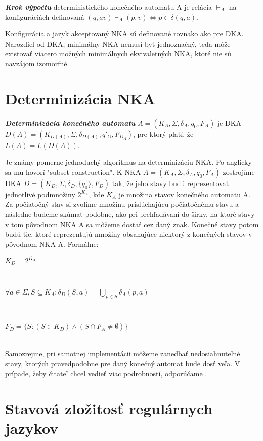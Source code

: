 \begin{defn}{\textbf {\textit {Krok výpočtu}}} deterministického konečného automatu A je relácia $\vdash_A$ na konfiguráciách definovaná $(q,av)\vdash_A(p,v) \Longleftrightarrow p \in \delta(q,a)$.\end{defn}

Konfigurácia a jazyk akceptovaný NKA sú definované rovnako ako pre DKA. Narozdiel od DKA, minimálny NKA nemusí byť jednoznačný, teda môže existovať viacero možných minimálnych ekvivaletných NKA, ktoré nie sú navzájom izomorfné.


\section{Determinizácia NKA}

\begin{defn}{\textbf {\textit {Determinizácia konečného automatu}}} $A = (K_A,\Sigma,\delta_A,q_{0},F_A)$ je DKA $D(A) = (K_{D(A)},\Sigma,\delta_{D(A)},q'_{O},F_{D_A})$, pre ktorý platí, že $L(A) = L(D(A))$.
\end{defn}

Je známy pomerne jednoduchý algoritmus na determinizáciu NKA. Po anglicky sa mu hovorí "subset construction". K NKA $A = (K_A,\Sigma,\delta_A,q_0,F_A)$ zostrojíme DKA $D = (K_D,\Sigma,\delta_D,\{q_0\},F_D)$ tak, že jeho stavy budú reprezentovať jednotlivé podmnožiny $2^{K_A}$, kde $K_A$ je množina stavov konečného automatu A. Za počiatočný stav si zvolíme množinu prislúchajúcu počiatočnému stavu a následne budeme skúmať podobne, ako pri prehľadávaní do širky, na ktoré stavy v tom pôvodnom NKA A sa môžeme dostať cez daný znak. Konečné stavy potom budú tie, ktoré reprezentujú množiny obsahujúce niektorý z konečných stavov v pôvodnom NKA A. Formálne: 
\\
\centerline {$K_D = 2^{K_A}$}
\\
\centerline {$\forall a \in \Sigma, S \subseteq K_A: \delta_D(S,a) = {\bigcup}_{p \in S} \delta_A(p,a)$}
\\
\centerline {$F_D = \{S: (S \in K_D) \wedge (S \cap F_A \neq \emptyset)\}$}
\\
Samozrejme, pri samotnej implementácii môžeme zanedbať nedosiahnuteľné stavy, ktorých pravedpodobne pre daný konečný automat bude dosť veľa. V prípade, žeby čitateľ chcel vedieť viac podrobností, odporúčame \cite[Kapitola 2.3.5]{hopcroft}.


\section{Stavová zložitosť regulárnych jazykov}

